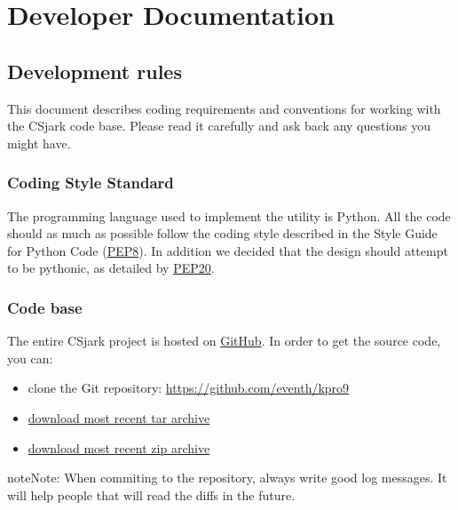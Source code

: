 \documentclass[A4paper,10pt,english]{sphinxmanual}
\begin{document}
\chapter{Developer Documentation}
\label{index:yaml}\label{index:developer-documentation}

\section{Development rules}
\label{devel/general:development-rules}\label{devel/general::doc}
This document describes coding requirements and conventions for working with the CSjark code base. Please read it carefully and ask back any questions you might have.


\subsection{Coding Style Standard}
\label{devel/general:coding-style-standard}
The programming language used to implement the utility is Python. All the code should as much as possible follow the coding style described in the Style Guide for Python Code (\href{http://www.python.org/dev/peps/pep-0008/}{PEP8}). In addition we decided that the design should attempt to be pythonic, as detailed by \href{http://www.python.org/dev/peps/pep-0020/}{PEP20}.


\subsection{Code base}
\label{devel/general:pep20}\label{devel/general:code-base}
The entire CSjark project is hosted on \href{https://github.com/}{GitHub}. In order to get the source code, you can:
\begin{itemize}
\item {} 
clone the Git repository: \href{https://github.com/eventh/kpro9}{https://github.com/eventh/kpro9}

\item {} 
\href{https://github.com/eventh/kpro9/zipball/master}{download most recent tar archive}

\item {} 
\href{https://github.com/eventh/kpro9/tarball/master}{download most recent zip archive}

\end{itemize}

\begin{notice}{note}{Note:}
When commiting to the repository, always write good log messages. It will help people that will read the diffs in the future.
\end{notice}
\end{document}
